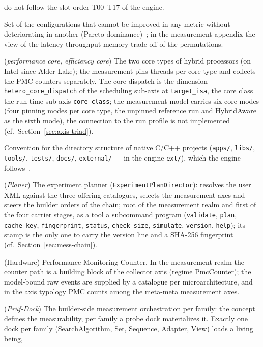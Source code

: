 \begin{description}
  do not follow the slot order T00--T17 of the engine.
  \item[Pareto front] Set of the configurations that cannot be improved in any metric without
  deteriorating in another (Pareto dominance)~\cite{emmerich2018multiobjective}; in the measurement
  appendix the view of the latency-throughput-memory trade-off of the permutations.
  \item[P-core, E-core] (\emph{performance core, efficiency core}) The two core types of hybrid
  processors (on Intel since Alder Lake); the measurement pins threads per core type and collects
  the PMC counters separately. The core dispatch is the dimension \texttt{hetero\_core\_dispatch}
  of the scheduling sub-axis at \texttt{target\_isa}, the core class the run-time sub-axis
  \texttt{core\_class}; the measurement model carries six core modes (four pinning modes per core
  type, the unpinned reference run and HybridAware as the sixth mode), the connection to the run
  profile is not implemented (cf.\ Section~\ref{sec:axis-triad}).
  \item[Pitchfork layout] Convention for the directory structure of native C/C++ projects
  (\texttt{apps/}, \texttt{libs/}, \texttt{tools/}, \texttt{tests/}, \texttt{docs/},
  \texttt{external/} --- in the engine \texttt{ext/}), which the engine
  follows~\cite{pike2018pitchfork}.
  \item[Planner] (\emph{Planer}) The experiment planner (\texttt{ExperimentPlanDirector}):
  resolves the user XML against the three offering catalogues, selects the measurement axes and steers
  the builder orders of the chain; root of the measurement realm and first of the four carrier
  stages, as a tool a subcommand program (\texttt{validate}, \texttt{plan}, \texttt{cache-key},
  \texttt{fingerprint}, \texttt{status}, \texttt{check-size}, \texttt{simulate}, \texttt{version},
  \texttt{help}); its stamp is the only one to carry the version line and a SHA-256 fingerprint
  (cf.\ Section~\ref{sec:mess-chain}).
  \item[PMC] (Hardware) Performance Monitoring Counter. In the measurement realm the counter path
  is a building block of the collector axis (regime PmcCounter); the model-bound raw events are
  supplied by a catalogue per microarchitecture, and in the axis typology PMC counts among the
  meta-meta measurement axes.
  \item[Probe dock] (\emph{Prüf-Dock}) The builder-side measurement orchestration per family: the
  concept defines the measurability, per family a probe dock materializes it. Exactly one dock per family (SearchAlgorithm, Set, Sequence, Adapter, View) loads a living being,

\end{description}
